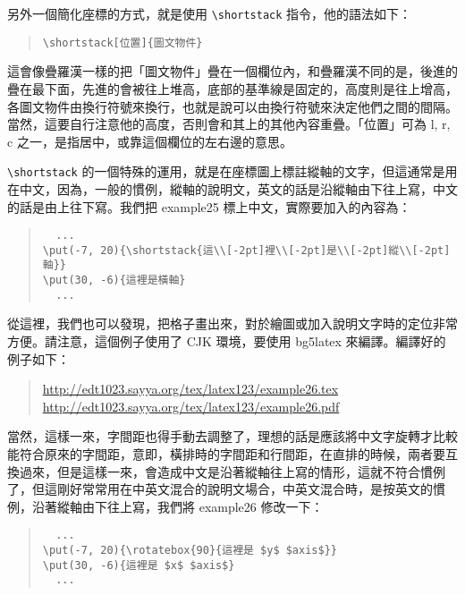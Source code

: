 另外一個簡化座標的方式，就是使用 \verb|\shortstack| 指令，他的語法如下：

\begin{quote}
  \begin{verbatim}
\shortstack[位置]{圖文物件}
\end{verbatim}
\end{quote}

這會像疊羅漢一樣的把「圖文物件」疊在一個欄位內，和疊羅漢不同的是，後進的疊在最下面，先進的會被往上堆高，底部的基準線是固定的，高度則是往上增高，各圖文物件由換行符號來換行，也就是說可以由換行符號來決定他們之間的間隔。當然，這要自行注意他的高度，否則會和其上的其他內容重疊。「位置」可為 {\ttfamily l, r, c} 之一，是指居中，或靠這個欄位的左右邊的意思。

\verb|\shortstack| 的一個特殊的運用，就是在座標圖上標註縱軸的文字，但這通常是用在中文，因為，一般的慣例，縱軸的說明文，英文的話是沿縱軸由下往上寫，中文的話是由上往下寫。我們把 {\ttfamily example25} 標上中文，實際要加入的內容為：

\begin{quote}
  \begin{verbatim}
  ...
\put(-7, 20){\shortstack{這\\[-2pt]裡\\[-2pt]是\\[-2pt]縱\\[-2pt]軸}}
\put(30, -6){這裡是橫軸}
  ...
\end{verbatim}
\end{quote}

從這裡，我們也可以發現，把格子畫出來，對於繪圖或加入說明文字時的定位非常方便。請注意，這個例子使用了 {\sffamily CJK} 環境，要使用 {\ttfamily bg5latex} 來編譯。編譯好的例子如下：

\begin{quote}
  \url{http://edt1023.sayya.org/tex/latex123/example26.tex}\\
  \url{http://edt1023.sayya.org/tex/latex123/example26.pdf}
\end{quote}

當然，這樣一來，字間距也得手動去調整了，理想的話是應該將中文字旋轉才比較能符合原來的字間距，意即，橫排時的字間距和行間距，在直排的時候，兩者要互換過來，但是這樣一來，會造成中文是沿著縱軸往上寫的情形，這就不符合慣例了，但這剛好常常用在中英文混合的說明文場合，中英文混合時，是按英文的慣例，沿著縱軸由下往上寫，我們將 {\ttfamily example26} 修改一下：

\begin{quote}
  \begin{verbatim}
  ...
\put(-7, 20){\rotatebox{90}{這裡是 $y$ $axis$}}
\put(30, -6){這裡是 $x$ $axis$}
  ...
\end{verbatim}
\end{quote}

